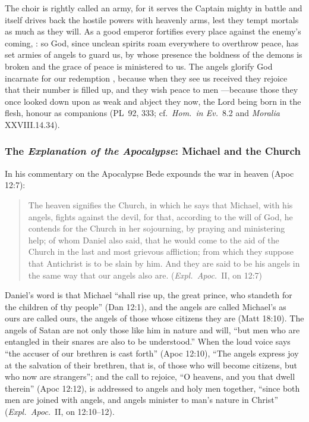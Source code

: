 \noindent The choir is rightly called an army, for it serves the Captain
mighty in battle and itself drives back the hostile powers with heavenly
arms, lest they tempt mortals as much as they will. As a good emperor
fortifies every place against the enemy's coming, : so God, since unclean spirits roam everywhere to overthrow
peace, has set armies of angels to guard us, by whose presence the boldness
of the demons is broken and the grace of peace is ministered to us. The
angels glorify God incarnate for our redemption , because when they see us
received they rejoice that their number is filled up, and they wish peace to
men ---because those they once looked down
upon as weak and abject they now, the Lord being born in the flesh, honour as
companions (PL~92, 333; cf.\ \emph{Hom.\ in Ev.}\ 8.2 and \emph{Moralia}
XXVIII.14.34).

\subsubsection{The \emph{Explanation of the Apocalypse}: Michael and the
Church}

In his commentary on the Apocalypse Bede expounds the war in heaven (Apoc
12:7):

\begin{quote}
The heaven signifies the Church, in which he says that Michael, with his
angels, fights against the devil, for that, according to the will of God, he
contends for the Church in her sojourning, by praying and ministering help;
of whom Daniel also said, that he would come to the aid of the Church in the
last and most grievous affliction; from which they suppose that Antichrist
is to be slain by him. And they are said to be his angels in the same way
that our angels also are. (\emph{Expl.\ Apoc.}\ II, on 12:7)
\end{quote}

\noindent Daniel's word is that Michael ``shall rise up, the great prince,
who standeth for the children of thy people'' (Dan 12:1), and the angels are
called Michael's as ours are called ours, the angels of those whose citizens
they are (Matt 18:10). The angels of Satan are not only those
like him in nature and will, ``but men who are entangled in their snares are
also to be understood.'' When the loud voice says ``the accuser of our
brethren is cast forth'' (Apoc 12:10), ``The angels express joy at the
salvation of their brethren, that is, of those who will become citizens, but
who now are strangers''; and the call to rejoice, ``O heavens, and you that
dwell therein'' (Apoc 12:12), is addressed to angels and holy men together,
``since both men are joined with angels, and angels minister to man's nature
in Christ'' (\emph{Expl.\ Apoc.}\ II, on 12:10--12).

